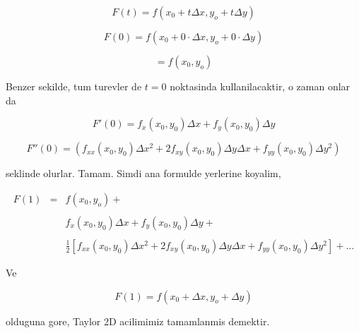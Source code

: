 \documentclass[12pt,fleqn]{article}
\begin{document}
\[ F(t) = f(x_0 + t\Delta x, y_o + t\Delta y) \]

\[ F(0) = f(x_0 + 0 \cdot \Delta x, y_o + 0 \cdot \Delta y) \]

\[ = f(x_0 , y_o) \]

Benzer sekilde, tum turevler de $t=0$ noktasinda kullanilacaktir, o zaman
onlar da

\[ F'(0) = f_x(x_0,y_0) \Delta x + f_y(x_0,y_0) \Delta y \]

\[ F''(0) =  
(f_{xx}(x_0,y_0)\Delta x^2 + 2f_{xy}(x_0,y_0)\Delta y \Delta x + 
f_{yy}(x_0,y_0)\Delta y^2 )
\]

seklinde olurlar. Tamam. Simdi ana formulde yerlerine koyalim,

\[ 
\begin{array}{lll}
F(1) &=& f(x_0 , y_o) +  \\ \\ 
&& f_x(x_0,y_0) \Delta x + f_y(x_0,y_0) \Delta y +   \\ \\
&& \frac{1}{2} 
[ 
f_{xx}(x_0,y_0)\Delta x^2 + 
2f_{xy}(x_0,y_0)\Delta y \Delta x +
f_{yy}(x_0,y_0)\Delta y^2 
] + ... 
\end{array}
 \]


Ve

\[ F(1) = f(x_0 +\Delta x, y_o + \Delta y) \]

olduguna gore, Taylor 2D acilimimiz tamamlanmis demektir. 
\end{document}
